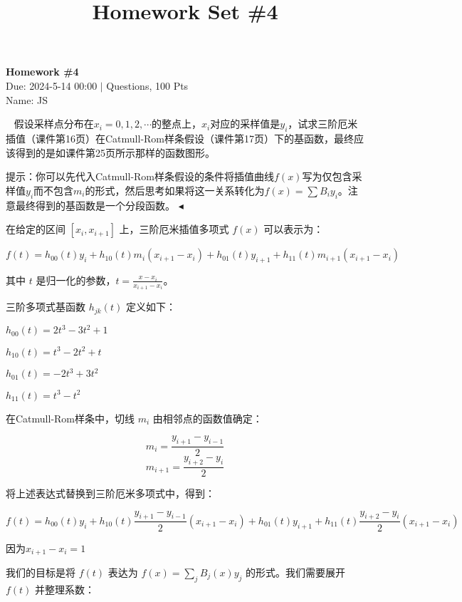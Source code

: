 \documentclass[11pt]{article}
\title{Homework Set \#4}
\newenvironment{question}[2][Question]{\begin{trivlist}
\item[\hskip \labelsep {\bfseries #1}\hskip \labelsep {\bfseries #2.}]}{\hfill$\blacktriangleleft$\end{trivlist}}
\begin{document}
    \pagestyle{fancy}
    \lhead{}
    \chead{}

    \begin{center}
        {\LARGE \bf Homework \#4}\\
        {Due: 2024-5-14 00:00 \quad$|$ Questions, 100 Pts}\\
        {Name: JS}
    \end{center}

    \begin{question}{1 (100') (插值)}~
    假设采样点分布在$x_i=0, 1, 2, \cdots$的整点上，$x_i$对应的采样值是$y_i$，试求三阶厄米插值（课件第16页）在Catmull-Rom样条假设（课件第17页）下的基函数，最终应该得到的是如课件第25页所示那样的函数图形。
    
    提示：你可以先代入Catmull-Rom样条假设的条件将插值曲线$f(x)$写为仅包含采样值$y_i$而不包含$m_i$的形式，然后思考如果将这一关系转化为$f(x)=\sum B_i y_i$。注意最终得到的基函数是一个分段函数。
    \end{question}

    
    在给定的区间 \([x_i, x_{i+1}]\) 上，三阶厄米插值多项式 \(f(x)\) 可以表示为：
    
    \[ f(t) = h_{00}(t) y_i + h_{10}(t) m_i (x_{i+1} - x_i ) + h_{01}(t) y_{i+1} + h_{11}(t) m_{i+1} (x_{i+1} - x_i ) \]
    
    其中 \(t\) 是归一化的参数，\( t = \frac{x - x_i}{x_{i+1} - x_i} \)。
    
    三阶多项式基函数 \(h_{jk}(t)\) 定义如下：
    
     \(h_{00}(t) = 2t^3 - 3t^2 + 1\)

     \(h_{10}(t) = t^3 - 2t^2 + t\)

     \(h_{01}(t) = -2t^3 + 3t^2\)

     \(h_{11}(t) = t^3 - t^2\)
    
    在Catmull-Rom样条中，切线 \(m_i\) 由相邻点的函数值确定：
    
    \[ m_i = \frac{y_{i+1} - y_{i-1}}{2} \]
    \[ m_{i+1} = \frac{y_{i+2} - y_i}{2} \]
    
    将上述表达式替换到三阶厄米多项式中，得到：
    
    \[ f(t) = h_{00}(t) y_i + h_{10}(t) \frac{y_{i+1} - y_{i-1}}{2}(x_{i+1} - x_i ) + h_{01}(t) y_{i+1} + h_{11}(t) \frac{y_{i+2} - y_i}{2}(x_{i+1} - x_i ) \]
    
    因为$x_{i+1} - x_i = 1$
    
    我们的目标是将 \(f(t)\) 表达为 \(f(x) = \sum_j B_j(x) y_j\) 的形式。我们需要展开 \(f(t)\) 并整理系数：
    
\end{document}
